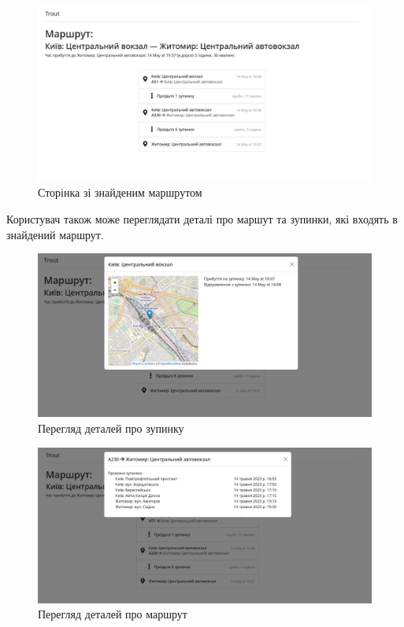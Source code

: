 \begin{figure}[!htp]
	\centering
	\includegraphics[scale=0.3]{content/chapters/4-results/assets/img/example1_result.png}
	\caption{Сторінка зі знайденим маршрутом}
	\label{fig:route_page}
\end{figure}


Користувач також може переглядати деталі про маршут та зупинки, які входять в знайдений маршрут.

\begin{figure}[!htp]
	\centering
	\includegraphics[scale=0.3]{content/chapters/4-results/assets/img/example_station.png}
	\caption{Перегляд деталей про зупинку}
	\label{fig:stop_details_page}
\end{figure}

\begin{figure}[!htp]
	\centering
	\includegraphics[scale=0.3]{content/chapters/4-results/assets/img/example_stops.png}
	\caption{Перегляд деталей про маршрут}
	\label{fig:route_details_page}
\end{figure}
